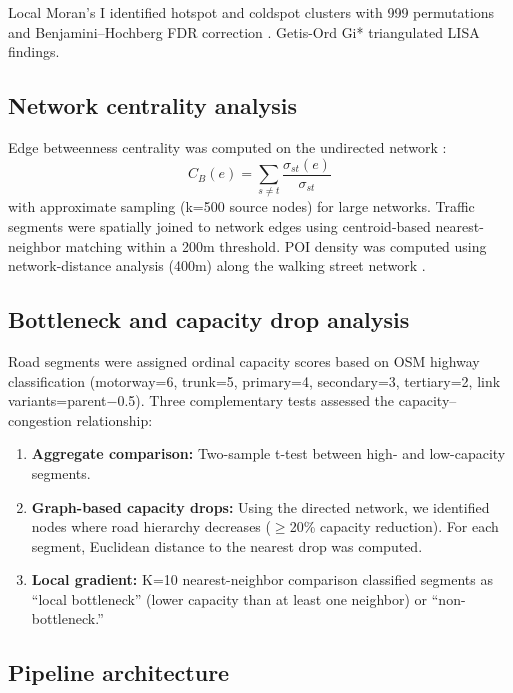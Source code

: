 \documentclass[preprint,12pt,authoryear]{elsarticle}
\begin{document}
Local Moran's I \citep{Anselin1995} identified hotspot and coldspot clusters with 999 permutations and Benjamini--Hochberg FDR correction \citep{Benjamini1995}. Getis-Ord Gi* \citep{Getis1992} triangulated LISA findings.

\subsection{Network centrality analysis}

Edge betweenness centrality was computed on the undirected network \citep{Boeing2017}:
\begin{equation}
C_B(e) = \sum_{s \neq t} \frac{\sigma_{st}(e)}{\sigma_{st}}
\end{equation}
with approximate sampling (k=500 source nodes) for large networks. Traffic segments were spatially joined to network edges using centroid-based nearest-neighbor matching within a 200m threshold. POI density was computed using network-distance analysis (400m) along the walking street network \citep{Moudon2006}.

\subsection{Bottleneck and capacity drop analysis}

Road segments were assigned ordinal capacity scores based on OSM highway classification (motorway=6, trunk=5, primary=4, secondary=3, tertiary=2, link variants=parent$-$0.5). Three complementary tests assessed the capacity--congestion relationship:

\begin{enumerate}
\item \textbf{Aggregate comparison:} Two-sample t-test between high- and low-capacity segments.
\item \textbf{Graph-based capacity drops:} Using the directed network, we identified nodes where road hierarchy decreases ($\geq$20\% capacity reduction). For each segment, Euclidean distance to the nearest drop was computed.
\item \textbf{Local gradient:} K=10 nearest-neighbor comparison classified segments as ``local bottleneck'' (lower capacity than at least one neighbor) or ``non-bottleneck.''
\end{enumerate}

\subsection{Pipeline architecture}
\label{sec:pipeline}
\end{document}
